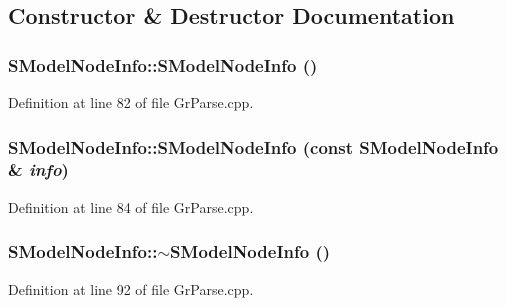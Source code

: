\subsection{Constructor \& Destructor Documentation}
\hypertarget{struct_s_model_node_info_7eafefb03fe7aaee5d2cd235140b9b89}{
\subsubsection[{SModelNodeInfo}]{\setlength{\rightskip}{0pt plus 5cm}SModelNodeInfo::SModelNodeInfo ()}}
\label{struct_s_model_node_info_7eafefb03fe7aaee5d2cd235140b9b89}




Definition at line 82 of file GrParse.cpp.\hypertarget{struct_s_model_node_info_3d47c8ef34c6a2936deabb0759c51f01}{
\subsubsection[{SModelNodeInfo}]{\setlength{\rightskip}{0pt plus 5cm}SModelNodeInfo::SModelNodeInfo (const {\bf SModelNodeInfo} \& {\em info})}}
\label{struct_s_model_node_info_3d47c8ef34c6a2936deabb0759c51f01}




Definition at line 84 of file GrParse.cpp.\hypertarget{struct_s_model_node_info_b9a91b477ee9cce04d7651b195ab3c34}{
\subsubsection[{$\sim$SModelNodeInfo}]{\setlength{\rightskip}{0pt plus 5cm}SModelNodeInfo::$\sim$SModelNodeInfo ()}}
\label{struct_s_model_node_info_b9a91b477ee9cce04d7651b195ab3c34}




Definition at line 92 of file GrParse.cpp.

